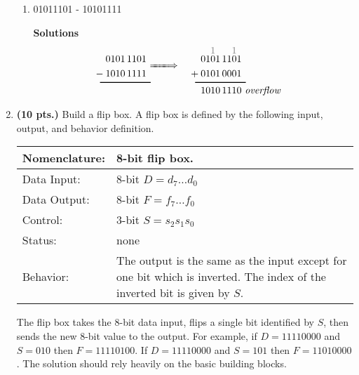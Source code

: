 \begin{enumerate}
\begin{enumerate}
                \item 01011101 - 10101111

                    \begin{onlysolution} \textbf{Solutions}
                        \begin{alignat*}{3}
                            &&{\color{gray}
                            \1 1\9\0\01\0 }\\[-1.5ex]
                            0101\,1101&&   0101\,1101\\
                            -\:1010\,1111&&+\:0101\,0001\\[-2ex]
                            \rule{12ex}{1pt}\hspace{-1ex}&\ \raisebox{3.5ex}[0pt][0pt]{$\xLongrightarrow{\phantom{80em}}$}\ &\rule{12ex}{1pt}\hspace{-1ex}\\[-1ex]
                            &&1010\,1110&\ \textit{overflow}
                        \end{alignat*}
                    \end{onlysolution}

            \end{enumerate}

        \item \textbf{ (10 pts.)}
            \label{page:flipbox}
            Build a flip box.  A flip box is defined by the following input,
            output, and behavior definition.

            \begin{tabular}{|l|p{3.5in}|} \hline
                Nomenclature:  & 8-bit flip box.                    \\ \hline
                Data Input:    & 8-bit $D=d_7 \ldots d_0$          \\ \hline
                Data Output:   & 8-bit $F=f_7 \ldots f_0$          \\ \hline
                Control:       & 3-bit $S=s_2 s_1 s_0$            \\ \hline
                Status:        & none                                   \\ \hline
                Behavior:      & The output is the same as the input except for
                one bit which is inverted.  The index of the inverted
                bit is given by $S$. \\ \hline
            \end{tabular}

            The flip box takes the 8-bit data input, flips a single bit identified
            by $S$, then sends the new 8-bit value to the output.
            For example, if $D=11110000$ and $S=010$ then
            $F=11110100$.  If $D=11110000$ and $S=101$ then $F=11010000$.  The solution
            should rely heavily on the basic building blocks.


\end{enumerate}
